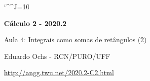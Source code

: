 \documentclass[oneside,12pt]{article}
\begin{document}
\catcode`\^^J=10

\pu

\long{}
\long{}
\long{}
\long{}
\long{}
\long{}
\long{}
\long{}
\long{}
\long{}
\long{}

\long{}
\long{}

\def\frown{\ensuremath{{=}{(}}}
\def\True {\mathbf{V}}
\def\False{\mathbf{F}}
\def\gr   {\mathsf{gr}}
\def\dom  {\mathsf{dom}}
\def\im   {\mathsf{im}}
\def\D    {\displaystyle}

\def\drafturl{http://angg.twu.net/LATEX/2020-2-C2.pdf}
\def\drafturl{http://angg.twu.net/2020.2-C2.html}
\def\draftfooter{\tiny \href{\drafturl}{\jobname{}} \ColorBrown{\shorttoday{} \hours}}



%

\thispagestyle{empty}

\begin{center}

\vspace*{1.2cm}

{\bf \Large Cálculo 2 - 2020.2}

\bsk

Aula 4: Integrais como somas de retângulos (2)

\bsk

Eduardo Ochs - RCN/PURO/UFF

\url{http://angg.twu.net/2020.2-C2.html}

\end{center}
\end{document}

